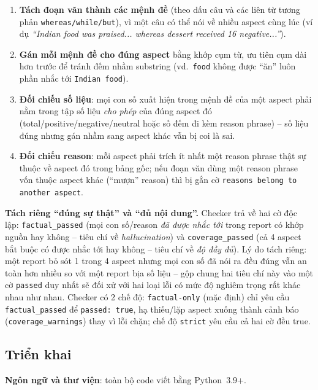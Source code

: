 \documentclass[11pt,a4paper]{article}
\begin{document}
\begin{enumerate}
    \item \textbf{Tách đoạn văn thành các mệnh đề} (theo dấu câu và các
        liên từ tương phản \texttt{whereas/\allowbreak while/\allowbreak but}), vì một câu có thể
        nói về nhiều aspect cùng lúc (ví dụ \emph{``Indian food was
        praised... whereas dessert received 16 negative...''}).
    \item \textbf{Gán mỗi mệnh đề cho đúng aspect} bằng khớp cụm từ, ưu
        tiên cụm dài hơn trước để tránh đếm nhầm substring (vd.\
        \texttt{food} không được ``ăn'' luôn phần nhắc tới
        \texttt{Indian food}).
    \item \textbf{Đối chiếu số liệu}: mọi con số xuất hiện trong mệnh đề
        của một aspect phải nằm trong tập số liệu \emph{cho phép} của
        đúng aspect đó (total/positive/negative/neutral hoặc số đếm đi
        kèm reason phrase) -- số liệu đúng nhưng gán nhầm sang aspect
        khác vẫn bị coi là sai.
    \item \textbf{Đối chiếu reason}: mỗi aspect phải trích ít nhất một
        reason phrase thật sự thuộc về aspect đó trong bảng gốc; nếu
        đoạn văn dùng một reason phrase vốn thuộc aspect khác (``mượn''
        reason) thì bị gắn cờ \texttt{reasons belong to another aspect}.
\end{enumerate}

\textbf{Tách riêng ``đúng sự thật'' và ``đủ nội dung''.} Checker trả về
hai cờ độc lập: \texttt{factual\_passed} (mọi con số/reason \emph{đã được
nhắc tới} trong report có khớp nguồn hay không -- tiêu chí về
\emph{hallucination}) và \texttt{coverage\_passed} (cả 4 aspect bắt buộc
có được nhắc tới hay không -- tiêu chí về \emph{độ đầy đủ}). Lý do tách
riêng: một report bỏ sót 1 trong 4 aspect nhưng mọi con số đã nói ra đều
đúng vẫn an toàn hơn nhiều so với một report bịa số liệu -- gộp chung hai
tiêu chí này vào một cờ \texttt{passed} duy nhất sẽ đối xử với hai loại
lỗi có mức độ nghiêm trọng rất khác nhau như nhau. Checker có 2 chế độ:
\texttt{factual-only} (mặc định) chỉ yêu cầu \texttt{factual\_passed} để
\texttt{passed: true}, hạ thiếu/lặp aspect xuống thành cảnh báo
(\texttt{coverage\_warnings}) thay vì lỗi chặn; chế độ \texttt{strict}
yêu cầu cả hai cờ đều true.

\subsection{Triển khai}

\textbf{Ngôn ngữ và thư viện}: toàn bộ code viết bằng Python~3.9+.
\end{document}
